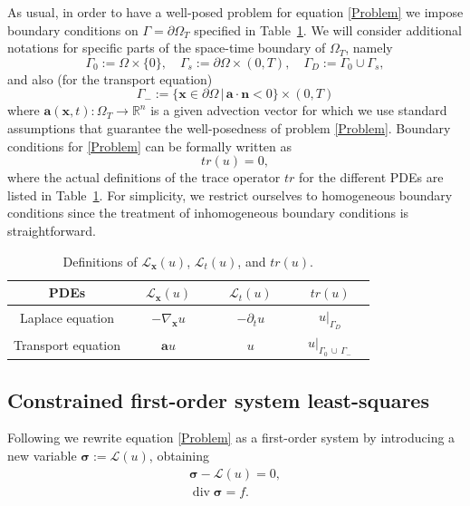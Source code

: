 \documentclass[a4paper,12pt]{amsart}
\numberwithin{equation}{section}
\renewcommand{\div}{\operatorname{div}}
\def\bu{{\mathbf a}} %
\def\bn{{\mathbf n}}
\renewcommand{\L}{{\mathcal L}}
\def\XVec#1{{\mathbf #1}}
\def\Xx{\XVec{x}}
\def\bsigma{{\boldsymbol \sigma}}
\begin{document}
As usual, in order to have a well-posed problem for equation \eqref{Problem} we impose boundary conditions on $\Gamma = \partial \Omega_T$ specified in Table~\ref{tab:PDE_operators}. We will consider additional notations for specific parts of the space-time boundary of $\Omega_T$, namely 
\[
\Gamma_0 := \Omega\times\{0\},\quad\Gamma_s := \partial\Omega\times(0, T),\quad\Gamma_D := \Gamma_0\cup\Gamma_s,
\]
and also (for the transport equation)
\[
\Gamma_- := \{\Xx\in\partial\Omega \,|\, \bu\cdot\bn < 0 \}\times(0, T)
\]
where $\bu(\Xx,t) : \Omega_T \rightarrow \mathbb{R}^n$ is a given advection vector for which we use standard assumptions that guarantee the well-posedness \cite{evans} of problem \eqref{Problem}. Boundary conditions for  \eqref{Problem} can be formally written as
\[
tr (u) = 0,
\]
where the actual definitions of the trace operator $tr$ for the different PDEs are listed in Table~\ref{tab:PDE_operators}. For simplicity, we restrict ourselves to homogeneous boundary conditions since the treatment of inhomogeneous boundary conditions is straightforward. 
\begin{table}[h]
\caption{Definitions of $\L_\Xx(u)$, $\L_t(u)$, and $tr(u)$.}
\label{tab:PDE_operators}
\begin{tabular}{ |c||c|c|c|} \hline
PDEs & $\quad \L_\Xx(u) \quad$ & $\quad \L_t(u) \quad$ & $\quad tr(u) \quad$  \\ \hline
Laplace equation & $-\nabla_\Xx u$ & $-\partial_t u$ & $u|_{\Gamma_D}$ \\ \hline
Transport equation & $\bu u$ & $u$ & $u|_{\Gamma_0\,\cup\,\Gamma_-}$   \\ \hline
\end{tabular}
\end{table}

\subsection{Constrained first-order system least-squares} 
Following \cite{neumueller_vassilevski_villa} we rewrite equation \eqref{Problem} as a first-order system by introducing a new variable $\bsigma := \L(u)$, 
obtaining 
\begin{equation}
\begin{array}{c}
\bsigma - \L(u)  = 0,  \\ 
\div \bsigma = f. 
\end{array}
\label{eq:fos} 
\end{equation}
\end{document}
